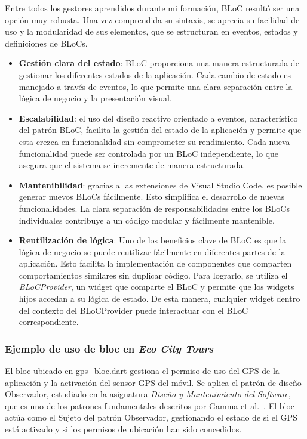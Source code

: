 	Entre todos los gestores aprendidos durante mi formación, BLoC resultó ser una opción muy robusta. Una vez comprendida su sintaxis, se aprecia su facilidad de uso y la modularidad de sus elementos, que se estructuran en eventos, estados y definiciones de BLoCs.
	\begin{itemize}
		
		\item \textbf{Gestión clara del estado}: BLoC proporciona una manera estructurada de gestionar los diferentes estados de la aplicación. Cada cambio de estado es manejado a través de eventos, lo que permite una clara separación entre la lógica de negocio y la presentación visual.
		
		\item \textbf{Escalabilidad}: el uso del diseño reactivo orientado a eventos, característico del patrón BLoC, facilita la gestión del estado de la aplicación y permite que esta crezca en funcionalidad sin comprometer su rendimiento. Cada nueva funcionalidad puede ser controlada por un BLoC independiente, lo que asegura que el sistema se incremente de manera estructurada.

		\item \textbf{Mantenibilidad}: gracias a las extensiones de Visual Studio Code, es posible generar nuevos BLoCs fácilmente. Esto simplifica el desarrollo de nuevas funcionalidades. La clara separación de responsabilidades entre los BLoCs individuales contribuye a un código modular y fácilmente mantenible.
				
		\item \textbf{Reutilización de lógica}: Uno de los beneficios clave de BLoC es que la lógica de negocio se puede reutilizar fácilmente en diferentes partes de la aplicación. Esto facilita la implementación de componentes que comparten comportamientos similares sin duplicar código. Para lograrlo, se utiliza el \textit{BLoCProvider}, un widget que comparte el BLoC y permite que los widgets hijos accedan a su lógica de estado. De esta manera, cualquier widget dentro del contexto del BLoCProvider puede interactuar con el BLoC correspondiente.
						
	\end{itemize}
	
	\subsubsection{Ejemplo de uso de \acrshort{bloc} en \textit{Eco City Tours}}
	El \acrshort{bloc} ubicado en \href{https://github.com/fps1001/TFGII_FPisot/tree/main/project-app/project_app/lib/blocs/gps/gps_bloc.dart}{gps\_bloc.dart} gestiona el permiso de uso del GPS de la aplicación y la activación del sensor GPS del móvil. 
	Se aplica el patrón de diseño Observador, estudiado en la asignatura \textit{Diseño y Mantenimiento del Software}, que es uno de los patrones fundamentales descritos por Gamma et al.~\cite{gamma2002}.
	El \acrshort{bloc} actúa como el Sujeto del patrón Observador, gestionando el estado de si el GPS está activado y si los permisos de ubicación han sido concedidos.
	
